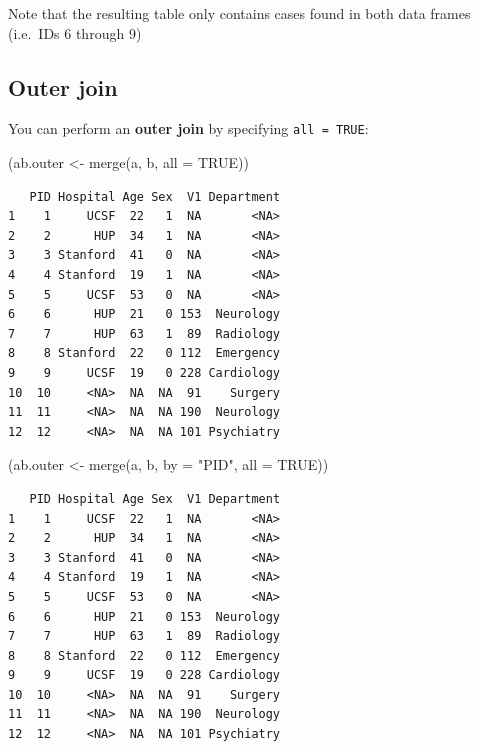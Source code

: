 \documentclass[
]{book}
\newenvironment{Shaded}{\begin{snugshade}}{\end{snugshade}}
\newcommand{\AttributeTok}[1]{\textcolor[rgb]{0.77,0.63,0.00}{#1}}
\newcommand{\ConstantTok}[1]{\textcolor[rgb]{0.00,0.00,0.00}{#1}}
\newcommand{\FunctionTok}[1]{\textcolor[rgb]{0.00,0.00,0.00}{#1}}
\newcommand{\NormalTok}[1]{#1}
\newcommand{\OtherTok}[1]{\textcolor[rgb]{0.56,0.35,0.01}{#1}}
\newcommand{\StringTok}[1]{\textcolor[rgb]{0.31,0.60,0.02}{#1}}
\begin{document}
Note that the resulting table only contains cases found in both data frames (i.e.~IDs 6 through 9)

\hypertarget{outer-join}{%
\subsection{Outer join}\label{outer-join}}

You can perform an \textbf{outer join} by specifying \texttt{all\ =\ TRUE}:

\begin{Shaded}
\begin{Highlighting}[]
\NormalTok{(ab.outer }\OtherTok{\textless{}{-}} \FunctionTok{merge}\NormalTok{(a, b, }\AttributeTok{all =} \ConstantTok{TRUE}\NormalTok{))}
\end{Highlighting}
\end{Shaded}

\begin{verbatim}
   PID Hospital Age Sex  V1 Department
1    1     UCSF  22   1  NA       <NA>
2    2      HUP  34   1  NA       <NA>
3    3 Stanford  41   0  NA       <NA>
4    4 Stanford  19   1  NA       <NA>
5    5     UCSF  53   0  NA       <NA>
6    6      HUP  21   0 153  Neurology
7    7      HUP  63   1  89  Radiology
8    8 Stanford  22   0 112  Emergency
9    9     UCSF  19   0 228 Cardiology
10  10     <NA>  NA  NA  91    Surgery
11  11     <NA>  NA  NA 190  Neurology
12  12     <NA>  NA  NA 101 Psychiatry
\end{verbatim}

\begin{Shaded}
\begin{Highlighting}[]
\NormalTok{(ab.outer }\OtherTok{\textless{}{-}} \FunctionTok{merge}\NormalTok{(a, b, }\AttributeTok{by =} \StringTok{"PID"}\NormalTok{, }\AttributeTok{all =} \ConstantTok{TRUE}\NormalTok{))}
\end{Highlighting}
\end{Shaded}

\begin{verbatim}
   PID Hospital Age Sex  V1 Department
1    1     UCSF  22   1  NA       <NA>
2    2      HUP  34   1  NA       <NA>
3    3 Stanford  41   0  NA       <NA>
4    4 Stanford  19   1  NA       <NA>
5    5     UCSF  53   0  NA       <NA>
6    6      HUP  21   0 153  Neurology
7    7      HUP  63   1  89  Radiology
8    8 Stanford  22   0 112  Emergency
9    9     UCSF  19   0 228 Cardiology
10  10     <NA>  NA  NA  91    Surgery
11  11     <NA>  NA  NA 190  Neurology
12  12     <NA>  NA  NA 101 Psychiatry
\end{verbatim}
\end{document}
